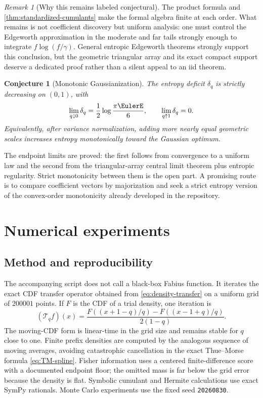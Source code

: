 \documentclass[11pt,oneside]{article}
\newtheorem{conjecture}[theorem]{Conjecture}
\theoremstyle{definition}
\theoremstyle{remark}
\newtheorem{remark}[theorem]{Remark}
\begin{document}
\begin{remark}[Why this remains labeled conjectural]
The product formula and \cref{thm:standardized-cumulants} make the formal algebra
finite at each order.  What remains is not coefficient discovery but uniform
analysis: one must control the Edgeworth approximation in the moderate and far
tails strongly enough to integrate $f\log(f/\gamma)$.  General entropic
Edgeworth theorems strongly support this conclusion, but the geometric triangular
array and its exact compact support deserve a dedicated proof rather than a silent
appeal to an iid theorem.
\end{remark}

\begin{conjecture}[Monotonic Gaussianization]
\label{conj:deficit-monotone}
The entropy deficit $\delta_q$ is strictly decreasing on $(0,1)$, with
\begin{equation}
 \lim_{q\downarrow0}\delta_q=\frac12\log\frac{\pi\EulerE}{6},
 \qquad
 \lim_{q\uparrow1}\delta_q=0.
 \label{eq:deficit-endpoints}
\end{equation}
Equivalently, after variance normalization, adding more nearly equal geometric
scales increases entropy monotonically toward the Gaussian optimum.
\end{conjecture}

The endpoint limits are proved: the first follows from convergence to a uniform
law and the second from the triangular-array central limit theorem plus entropic
regularity.  Strict monotonicity between them is the open part.  A promising route
is to compare coefficient vectors by majorization and seek a strict entropy
version of the convex-order monotonicity already developed in the repository.

\section{Numerical experiments}
\label{sec:numerics}

\subsection{Method and reproducibility}

The accompanying script  does not call a black-box Fabius
function.  It iterates the exact CDF transfer operator obtained from
\eqref{eq:density-transfer} on a uniform grid of $200001$ points.  If $F$ is the
CDF of a trial density, one iteration is
\begin{equation}
 (\mathcal T_qf)(x)
 =\frac{F((x+1-q)/q)-F((x-1+q)/q)}{2(1-q)}.
 \label{eq:numerical-transfer}
\end{equation}
The moving-CDF form is linear-time in the grid size and remains stable for
$q$ close to one.  Finite prefix densities are computed by the analogous sequence
of moving averages, avoiding catastrophic cancellation in the exact
Thue--Morse formula \eqref{eq:TM-spline}.  Fisher information uses a centered
finite-difference score with a documented endpoint floor; the omitted mass is far
below the grid error because the density is flat.  Symbolic cumulant and Hermite
calculations use exact SymPy rationals.  Monte Carlo experiments use the fixed seed
\texttt{20260830}.
\end{document}
